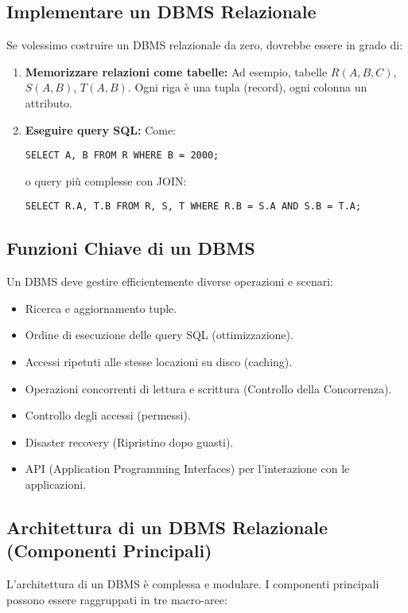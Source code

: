 \subsection{Implementare un DBMS Relazionale}
Se volessimo costruire un DBMS relazionale da zero, dovrebbe essere in grado di:
\begin{enumerate}
    \item \textbf{Memorizzare relazioni come tabelle:} Ad esempio, tabelle $R(A,B,C)$, $S(A,B)$, $T(A,B)$. Ogni riga è una tupla (record), ogni colonna un attributo.
    \item \textbf{Eseguire query SQL:} Come:
    \begin{verbatim}
SELECT A, B FROM R WHERE B = 2000;
    \end{verbatim}
    o query più complesse con JOIN:
    \begin{verbatim}
SELECT R.A, T.B FROM R, S, T WHERE R.B = S.A AND S.B = T.A;
    \end{verbatim}
\end{enumerate}

\subsection{Funzioni Chiave di un DBMS}
Un DBMS deve gestire efficientemente diverse operazioni e scenari:
\begin{itemize}
    \item Ricerca e aggiornamento tuple.
    \item Ordine di esecuzione delle query SQL (ottimizzazione).
    \item Accessi ripetuti alle stesse locazioni su disco (caching).
    \item Operazioni concorrenti di lettura e scrittura (Controllo della Concorrenza).
    \item Controllo degli accessi (permessi).
    \item Disaster recovery (Ripristino dopo guasti).
    \item API (Application Programming Interfaces) per l'interazione con le applicazioni.
\end{itemize}

\subsection{Architettura di un DBMS Relazionale (Componenti Principali)}
L'architettura di un DBMS è complessa e modulare. I componenti principali possono essere raggruppati in tre macro-aree:

